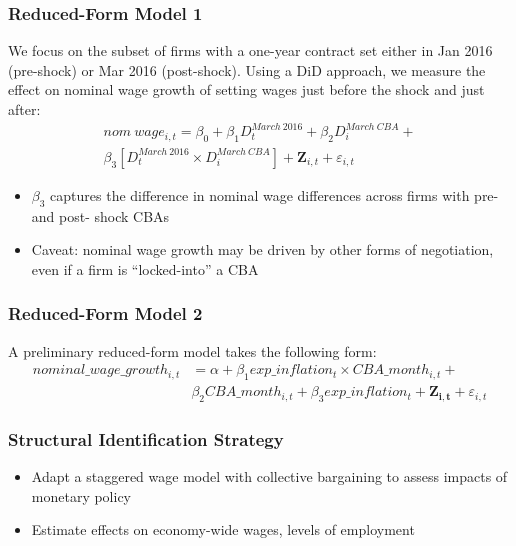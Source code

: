 \documentclass{beamer}
\begin{document}
\begin{frame}
	\frametitle{Reduced-Form Model 1}
	We focus on the subset of firms with a one-year contract set either in Jan 2016 (pre-shock) or Mar 2016 (post-shock). Using a DiD approach, we measure the effect on nominal wage growth of setting wages just before the shock and just after:
	\begin{align*}
		nom\:wage_{i,t} = \beta_0 + \beta_1 D_{t}^{March\:2016} + \beta_2 D^{March\:CBA}_{i} +\\
		 \beta_3[ D_{t}^{March\:2016} \times D^{March\:CBA}_{i}] + \mathbf{Z}_{i,t} + \varepsilon_{i,t}
 	\end{align*}
 	\begin{itemize}
 		\item $\beta_3$ captures the difference in nominal wage differences across firms with pre- and post- shock CBAs
 		\item Caveat: nominal wage growth may be driven by other forms of negotiation, even if a firm is ``locked-into''  a CBA
 	\end{itemize}
\end{frame}
\begin{frame}
	\frametitle{Reduced-Form Model 2}
		A preliminary reduced-form model takes the following form:
		\begin{align*}
			nominal\_wage\_growth_{i,t} & = \alpha + \beta_1 exp\_inflation_t \times CBA\_month_{i,t} +\\
			& \beta_2 CBA\_month_{i,t} + \beta_3 exp\_inflation_t + \mathbf{Z_{i,t}} + \varepsilon_{i,t} 	
		\end{align*}
\end{frame}


\begin{frame}
	\begin{center}
			\scalebox{.45}{}
	\end{center}
\end{frame}

\begin{frame}
\frametitle{Structural Identification Strategy}
	\begin{itemize}
		\item Adapt a staggered wage model with collective bargaining to assess impacts of monetary policy  
		\item Estimate effects on economy-wide wages, levels of employment
	\end{itemize}
\end{frame}
\end{document}
